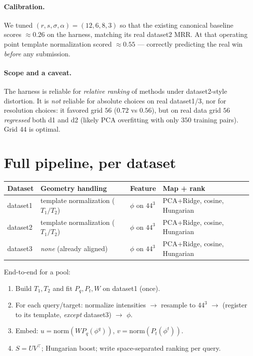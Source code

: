 \documentclass[11pt]{article}
\begin{document}
\paragraph{Calibration.} We tuned $(r,s,\sigma,\alpha)=(12,6,8,3)$ so that the
existing canonical baseline scores $\approx0.26$ on the harness, matching its real
dataset2 MRR. At that operating point template normalization scored $\approx0.55$
--- correctly predicting the real win \emph{before} any submission.

\paragraph{Scope and a caveat.} The harness is reliable for \emph{relative ranking}
of methods under dataset2-style distortion. It is \emph{not} reliable for absolute
choices on real dataset1/3, nor for resolution choices: it favored grid $56$
($0.72$ vs $0.56$), but on real data grid $56$ \emph{regressed} both d1 and d2
(likely PCA overfitting with only $350$ training pairs). Grid $44$ is optimal.

\section{Full pipeline, per dataset}

\begin{center}
\begin{tabular}{@{}llll@{}}
\toprule
Dataset & Geometry handling & Feature & Map + rank \\
\midrule
dataset1 & template normalization ($T_1/T_2$) & $\phi$ on $44^3$ & PCA+Ridge, cosine, Hungarian\\
dataset2 & template normalization ($T_1/T_2$) & $\phi$ on $44^3$ & PCA+Ridge, cosine, Hungarian\\
dataset3 & \emph{none} (already aligned)       & $\phi$ on $44^3$ & PCA+Ridge, cosine, Hungarian\\
\bottomrule
\end{tabular}
\end{center}

\noindent End-to-end for a pool:
\begin{enumerate}[nosep]
  \item Build $T_1,T_2$ and fit $P_q,P_t,W$ on dataset1 (once).
  \item For each query/target: normalize intensities $\to$ resample to $44^3$ $\to$
        (register to its template, \emph{except} dataset3) $\to$ $\phi$.
  \item Embed: $u=\mathrm{norm}(W P_q(\phi^q))$, $v=\mathrm{norm}(P_t(\phi^t))$.
  \item $S=UV^\top$; Hungarian boost; write space-separated ranking per query.
\end{enumerate}
\end{document}
